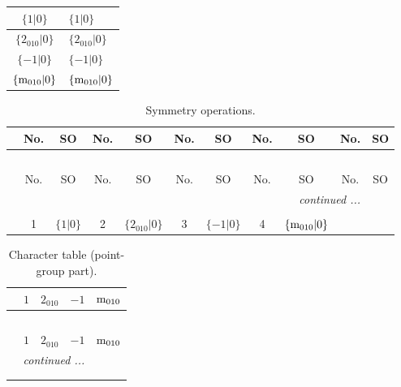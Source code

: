\documentclass[fleqn,10pt,landscape]{article}
\begin{document}
\begin{itemize}
\begin{center}
\begin{longtable}{c|l}
$\{1|0\}$ & $\{1|0\}$ \\ \hline
$\{2{}_{010}|0\}$ & $\{2{}_{010}|0\}$ \\ \hline
$\{-1|0\}$ & $\{-1|0\}$ \\ \hline
$\{{\rm m}_{010}|0\}$ & $\{{\rm m}_{010}|0\}$ \\
\end{longtable}
\end{center}
\begin{center}
\renewcommand{\arraystretch}{1.3}
\begin{longtable}{c|cc|cc|cc|cc|cc}
\caption{Symmetry operations.}
 \\
 \hline \hline
 & No. & SO & No. & SO & No. & SO & No. & SO & No. & SO \\ \hline \endfirsthead

\multicolumn{10}{l}{\tablename\ \thetable{}} \\
 \hline \hline
 & No. & SO & No. & SO & No. & SO & No. & SO & No. & SO \\ \hline \endhead

 \hline \hline
\multicolumn{10}{r}{\footnotesize\it continued ...} \\ \endfoot

 \hline \hline
\multicolumn{10}{r}{} \\ \endlastfoot

 & 1 & $\{1|0\}$ & 2 & $\{2{}_{010}|0\}$ & 3 & $\{-1|0\}$ & 4 & $\{{\rm m}_{010}|0\}$ \\
\end{longtable}
\end{center}
\begin{center}
\renewcommand{\arraystretch}{1.0}
\begin{longtable}{c|rrrr}
\caption{Character table (point-group part).}
 \\
 \hline \hline
 & $ 1 $ & $ 2{}_{010} $ & $ -1 $ & $ {\rm m}_{010} $ \\ \hline \endfirsthead

\multicolumn{4}{l}{\tablename\ \thetable{}} \\
 \hline \hline
 & $ 1 $ & $ 2{}_{010} $ & $ -1 $ & $ {\rm m}_{010} $ \\ \hline \endhead

 \hline \hline
\multicolumn{4}{r}{\footnotesize\it continued ...} \\ \endfoot

 \hline \hline
\multicolumn{4}{r}{} \\ \endlastfoot


\end{longtable}
\end{center}
\end{itemize}
\end{document}
